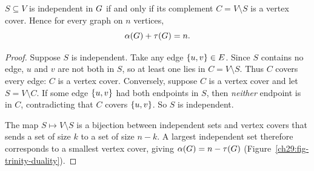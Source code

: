\begin{theorem}
\label{ch29:thm-gallai}
$S\subseteq V$ is independent in $G$ if and only if its complement
$C=V\setminus S$ is a vertex cover. Hence for every graph on $n$ vertices,
\[
  \alpha(G)+\tau(G)=n.
\]
\end{theorem}

\begin{proof}
Suppose $S$ is independent. Take any edge $\{u,v\}\in E$. Since $S$ contains no
edge, $u$ and $v$ are not both in $S$, so at least one lies in $C=V\setminus S$.
Thus $C$ covers every edge: $C$ is a vertex cover. Conversely, suppose $C$ is a
vertex cover and let $S=V\setminus C$. If some edge $\{u,v\}$ had both
endpoints in $S$, then \emph{neither} endpoint is in $C$, contradicting that $C$
covers $\{u,v\}$. So $S$ is independent.

The map $S\mapsto V\setminus S$ is a bijection between independent sets and
vertex covers that sends a set of size $k$ to a set of size $n-k$. A largest
independent set therefore corresponds to a smallest vertex cover, giving
$\alpha(G)=n-\tau(G)$ (Figure~\ref{ch29:fig-trinity-duality}).
\end{proof}

